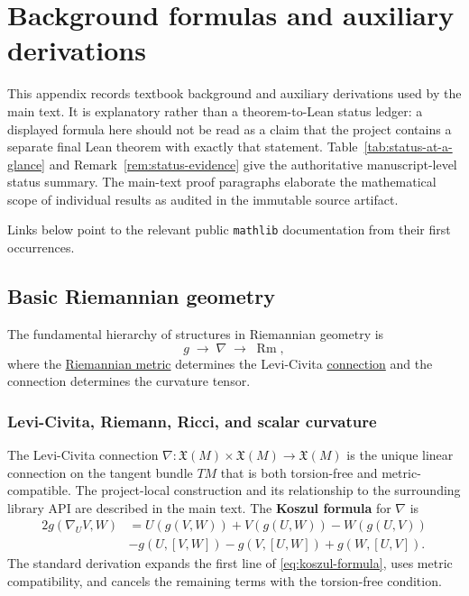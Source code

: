 \documentclass[11pt]{article}
\theoremstyle{plain}
\theoremstyle{definition}
\theoremstyle{remark}
\newcommand{\Rm}{\operatorname{Rm}}
\begin{document}
\section{Background formulas and auxiliary derivations}

This appendix records textbook background and auxiliary derivations used by the
main text.  It is explanatory rather than a theorem-to-Lean status ledger: a
displayed formula here should not be read as a claim that the project contains a
separate final Lean theorem with exactly that statement.
Table~\ref{tab:status-at-a-glance} and
Remark~\ref{rem:status-evidence} give the authoritative manuscript-level
status summary.  The main-text proof paragraphs elaborate the mathematical
scope of individual results as audited in the immutable source artifact.

Links below point to the relevant public \texttt{mathlib} documentation from their first occurrences.

\subsection{Basic Riemannian geometry}\label{subsec:BasicRiemGeom}

The fundamental hierarchy of structures in Riemannian geometry is
\[
g \;\longrightarrow\; \nabla \;\longrightarrow\; \Rm ,
\]
where the \href{https://leanprover-community.github.io/mathlib4_docs/Mathlib/Geometry/Manifold/VectorBundle/Riemannian.html}{Riemannian metric} determines the Levi-Civita \href{https://leanprover-community.github.io/mathlib4_docs/Mathlib/Geometry/Manifold/VectorBundle/CovariantDerivative/Basic.html}{connection} and the connection
determines the curvature tensor.

\subsubsection{Levi-Civita, Riemann, Ricci, and scalar curvature}


The Levi-Civita connection
$\nabla: \mathfrak{X}(M) \times \mathfrak{X}(M) \to \mathfrak{X}(M)$
is the unique linear connection on the tangent bundle $TM$ that is both
torsion-free and metric-compatible.  The project-local construction and its
relationship to the surrounding library API are described in the main text.
The \textbf{Koszul formula} for
$\nabla$ is
\begin{align}
 2g\left(  \nabla_{U}V,W\right)   &  =U\left(  g\left(  V,W\right)  \right)
+V\left(  g\left(  U,W\right)  \right)  -W\left(  g\left(  U,V\right)  \right)
\nonumber \\
&   -g\left( U,  \left[  V,W\right] \right) -g\left( V, \left[  U,W\right]
\right)    + g\left( W, \left[  U,V\right]  \right)   .   \label{eq:koszul-formula}
\end{align}
The standard derivation expands the first line of
\eqref{eq:koszul-formula}, uses metric compatibility, and cancels the
remaining terms with the torsion-free condition.
\end{document}
